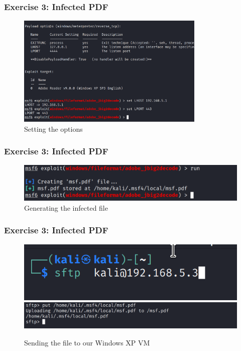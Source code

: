 \documentclass[handout]{beamer}
\begin{document}
\begin{frame}
    \frametitle{Exercise 3: Infected PDF}
    \begin{figure}
        \centering
        \includegraphics[width=0.8\textwidth]{../drawable/exercise_3_screenshots/module_set_options.png}
        \caption{Setting the options}
    \end{figure}
\end{frame}

\begin{frame}
    \frametitle{Exercise 3: Infected PDF}
    \begin{figure}
        \centering
        \includegraphics[width=\textwidth]{../drawable/exercise_3_screenshots/run_exploit.png}
        \caption{Generating the infected file}
    \end{figure}
\end{frame}

\begin{frame}
    \frametitle{Exercise 3: Infected PDF}
    \begin{figure}
        \centering
        \includegraphics[width=\textwidth]{../drawable/exercise_3_screenshots/sftp_infected_file.png}
        \includegraphics[width=\textwidth]{../drawable/exercise_3_screenshots/put_completed.png}
        \caption{Sending the file to our Windows XP VM}
    \end{figure}
\end{frame}
\end{document}
